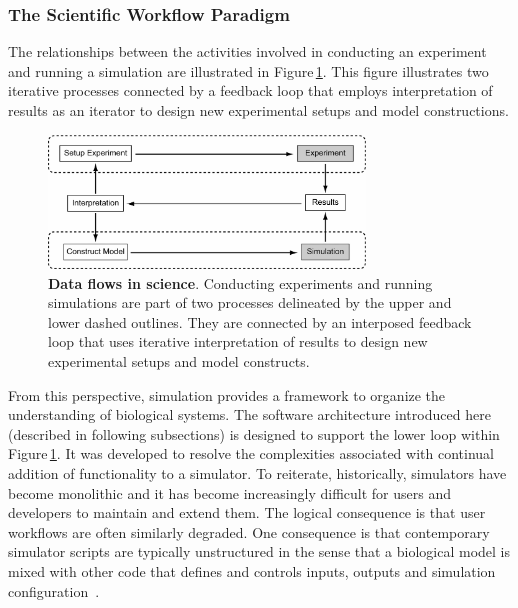 \documentclass[10pt,letterpaper]{article}
\begin{document}
\subsubsection*{The Scientific Workflow Paradigm}

The relationships between the activities involved in conducting an experiment and running a simulation are illustrated in Figure\,\ref{fig3}.  This figure illustrates two iterative processes connected by a feedback loop that employs interpretation of results as an iterator to design new experimental setups and model constructions.

\begin{figure}[h!t]
  \begin{center}
    \includegraphics[width=0.75\textwidth]{figures/exp-sim.pdf}
  \end{center}
  \caption{ \small{\textbf{Data flows in science}. Conducting experiments and running simulations are part of two processes delineated by the upper and lower dashed outlines. They are connected by an interposed feedback loop that uses iterative interpretation of results to design new experimental setups and model constructs.}}
    \label{fig3}
\end{figure}

From this perspective, simulation provides a framework to organize the understanding of biological systems. The software architecture introduced here (described in following subsections) is designed to support the lower loop within Figure\,\ref{fig3}. It was developed to resolve the complexities associated with continual addition of functionality to a simulator. To reiterate, historically, simulators have become monolithic and it has become increasingly difficult for users and developers to maintain and extend them. The logical consequence is that user workflows are often similarly degraded. One consequence is that contemporary simulator scripts are typically unstructured in the sense that a biological model is mixed with other code that defines and controls inputs, outputs and simulation configuration~\cite{cannon07:_inter}.
\end{document}
